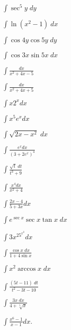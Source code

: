 \begin{exercises}
$\int \sec^5y \; dy$

$\int \ln(x^2-1) \; dx$

$\int \cos4y \cos5y \; dy$

$\int \cos3x \sin5x \; dx$

$\int \frac{dx}{x^2+4x-5}$

$\int \frac{dx}{x^2+4x+5}$

$\int x2^xdx$

$\int x^5e^xdx$

$\int \sqrt{2x-x^2} \; dx$

$\int \frac{e^xdx}{(3+2e^x)^4}$

$\int \frac{\sqrt{t}\;dt}{t^3+9}$

$\int \frac{x^4dx}{x^2+4}$

$\int \frac{2x-4}{5+3x}dx$

$\int e^{\sec x} \sec x \tan x \; dx$

$\int 3x^25^{x^3}dx$

$\int \frac{\cos x \; dx}{1+4\sin x}$

$\int x^2\arccos x \; dx$

$\int \frac{(5t-11)\;dt}{t^2-3t-10}$

$\int \frac{3x\;dx}{4+\sqrt[5]x}$

$\int \frac{x^6-1}{x-1} dx$.

\end{exercises}
